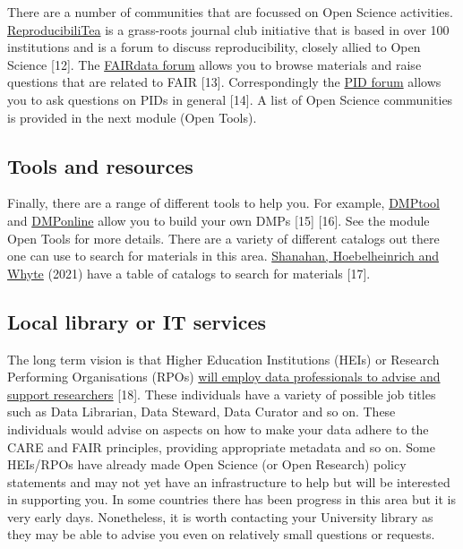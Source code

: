 \documentclass[
  letterpaper,
  DIV=11,
  numbers=noendperiod]{scrreport}
\begin{document}
There are a number of communities that are focussed on Open Science
activities. \href{https://reproducibilitea.org/}{ReproducibiliTea} is a
grass-roots journal club initiative that is based in over 100
institutions and is a forum to discuss reproducibility, closely allied
to Open Science {[}12{]}. The \href{https://fairdataforum.org/}{FAIRdata
forum} allows you to browse materials and raise questions that are
related to FAIR {[}13{]}. Correspondingly the
\href{https://pidforum.org/}{PID forum} allows you to ask questions on
PIDs in general {[}14{]}. A list of Open Science communities is provided
in the next module (Open Tools).

\hypertarget{tools-and-resources}{%
\subsection{\texorpdfstring{\textbf{Tools and
resources}}{Tools and resources}}\label{tools-and-resources}}

Finally, there are a range of different tools to help you. For example,
\href{https://dmptool.org/quick_start_guide}{DMPtool} and
\href{https://dmponline.dcc.ac.uk/}{DMPonline} allow you to build your
own DMPs {[}15{]} {[}16{]}. See the module Open Tools for more details.
There are a variety of different catalogs out there one can use to
search for materials in this area.
\href{https://www.sciencedirect.com/science/article/pii/S2666389921001720}{Shanahan,
Hoebelheinrich and Whyte} (2021) have a table of catalogs to search for
materials {[}17{]}.

\hypertarget{local-library-or-it-services}{%
\subsection{\texorpdfstring{\textbf{Local library or IT
services}}{Local library or IT services}}\label{local-library-or-it-services}}

The long term vision is that Higher Education Institutions (HEIs) or
Research Performing Organisations (RPOs)
\href{http://insights.uksg.org/articles/10.1629/uksg.484/}{will employ
data professionals to advise and support researchers} {[}18{]}. These
individuals have a variety of possible job titles such as Data
Librarian, Data Steward, Data Curator and so on. These individuals would
advise on aspects on how to make your data adhere to the CARE and FAIR
principles, providing appropriate metadata and so on. Some HEIs/RPOs
have already made Open Science (or Open Research) policy statements and
may not yet have an infrastructure to help but will be interested in
supporting you. In some countries there has been progress in this area
but it is very early days. Nonetheless, it is worth contacting your
University library as they may be able to advise you even on relatively
small questions or requests.
\end{document}
